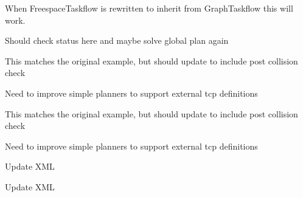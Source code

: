 
\begin{DoxyRefList}
\item[Member \mbox{\hyperlink{taskflow__profiling__example_8cpp_ae66f6b31b5ad750f1fe042a706a4e3d4}{main}} ()]\label{todo__todo000038}%
%
When Freespace\+Taskflow is rewritten to inherit from Graph\+Taskflow this will work.  
\item[Member \mbox{\hyperlink{classtesseract__examples_1_1OnlinePlanningExample_a354985cdbaa511e24b5c010271477fad}{tesseract\+\_\+examples\+::Online\+Planning\+Example\+::online\+Plan}} ()]\label{todo__todo000001}%
%
Should check status here and maybe solve global plan again  
\item[Member \mbox{\hyperlink{classtesseract__examples_1_1PuzzlePieceAuxillaryAxesExample_a80bdddfe2d2d8a0f57f18351acd706fc}{tesseract\+\_\+examples\+::Puzzle\+Piece\+Auxillary\+Axes\+Example\+::run}} () override final]\label{todo__todo000002}%
%
This matches the original example, but should update to include post collision check 

\label{todo__todo000003}%
%
Need to improve simple planners to support external tcp definitions  
\item[Member \mbox{\hyperlink{classtesseract__examples_1_1PuzzlePieceExample_ae060f91174e938a20c6cca4962009c03}{tesseract\+\_\+examples\+::Puzzle\+Piece\+Example\+::run}} () override final]\label{todo__todo000004}%
%
This matches the original example, but should update to include post collision check 

\label{todo__todo000005}%
%
Need to improve simple planners to support external tcp definitions  
\item[Member \mbox{\hyperlink{classtesseract__planning_1_1DescartesDefaultPlanProfile_a8bbf9dd170dfc5da44f4117d74ca7a6a}{tesseract\+\_\+planning\+::Descartes\+Default\+Plan\+Profile\texorpdfstring{$<$}{<} Float\+Type \texorpdfstring{$>$}{>}\+::Descartes\+Default\+Plan\+Profile}} (const tinyxml2\+::\+XMLElement \&xml\+\_\+element)]\label{todo__todo000012}%
%
Update XML 

\label{todo__todo000013}%
%
Update XML 


\end{DoxyRefList}
